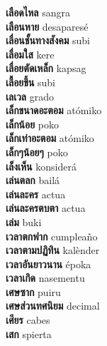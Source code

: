 \textbf{ เลือดไหล  } sangra \\
\textbf{ เลือนหาย  } desaparesé \\
\textbf{ เลื่อนชั้นทางสังคม  } subi \\
\textbf{ เลื่อมใส  } kere \\
\textbf{ เลื่อยตัดเหล็ก  } kapsag \\
\textbf{ เลื้อยขึ้น  } subi \\
\textbf{ เลเวล  } grado \\
\textbf{ เล็กขนาดอะตอม  } atómiko \\
\textbf{ เล็กน้อย  } poko \\
\textbf{ เล็กเท่าอะตอม  } atómiko \\
\textbf{ เล็กๆน้อยๆ  } poko \\
\textbf{ เล็งเห็น  } konsiderá \\
\textbf{ เล่นตลก  } bailá \\
\textbf{ เล่นละคร  } actua \\
\textbf{ เล่นละครตบตา  } actua \\
\textbf{ เล่ม  } buki \\
\textbf{ เวลาตกฟาก  } cumpleaño \\
\textbf{ เวลาตามปฏิทิน  } kalènder \\
\textbf{ เวลาอันยาวนาน  } époka \\
\textbf{ เวลาเกิด  } nasementu \\
\textbf{ เศษซาก  } puiru \\
\textbf{ เศษส่วนทศนิยม  } decimal \\
\textbf{ เศียร  } cabes \\
\textbf{ เสก  } spierta \\
